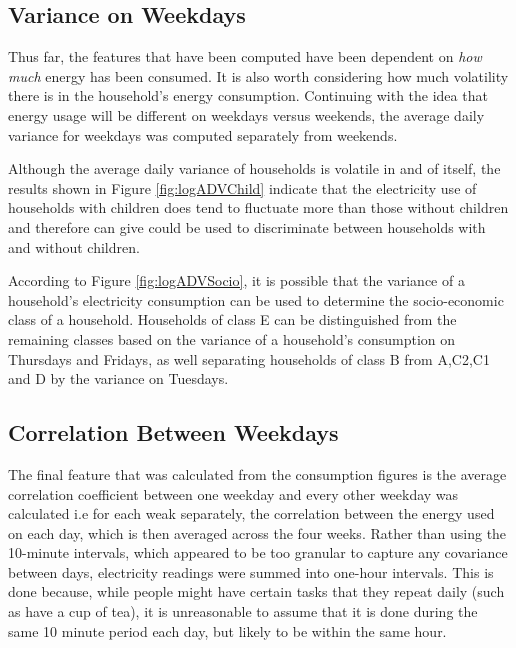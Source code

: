\subsection*{Variance on Weekdays}
Thus far, the features that have been computed have been dependent on \textit{how much} energy has been consumed. It is also worth considering how much volatility there is in the household's energy consumption. Continuing with the idea that energy usage will be different on weekdays versus weekends, the average daily variance for weekdays was computed separately from weekends. 

\logADVChild %


Although the average daily variance of households is volatile in and of itself, the results shown in Figure \ref{fig:logADVChild} indicate that the electricity use of households with children does tend to fluctuate more than those without children and therefore can give could be used to discriminate between households with and without children. 

\logADVSocio %

According to Figure \ref{fig:logADVSocio}, it is possible that the variance of a household's electricity consumption can be used to determine the socio-economic class of a household. Households of class E can be distinguished from the remaining classes based on the variance of a household's consumption on Thursdays and Fridays, as well separating households of class B from A,C2,C1 and D by the variance on Tuesdays. %


\subsection*{Correlation Between Weekdays}

The final feature that was calculated from the consumption figures is the average correlation coefficient between one weekday and every other weekday was calculated i.e for each weak separately, the correlation between the energy used on each day, which is then averaged across the four weeks. Rather than using the 10-minute intervals, which appeared to be too granular to capture any covariance between days, electricity readings were summed into one-hour intervals. This is done because, while people might have certain tasks that they repeat daily (such as have a cup of tea), it is unreasonable to assume that it is done during the same 10 minute period each day, but likely to be within the same hour.  


